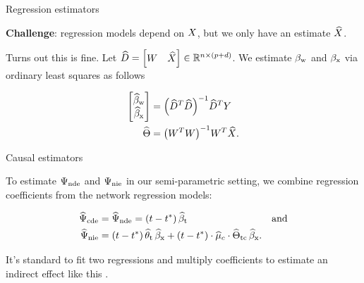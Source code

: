 \documentclass{beamer}
\theoremstyle{remark}
\begin{document}
\begin{frame}{Regression estimators}

    \textbf{Challenge}: regression models depend on $X$, but we only have an estimate $\widehat{X}$.

    \vspace{3mm}

    Turns out this is fine. Let $\widehat{D} = \begin{bmatrix} W & \widehat{X} \end{bmatrix} \in \mathbb{R}^{n \times (p + d)}$. We estimate $\beta_\text{w}$ and $\beta_\text{x}$ via ordinary least squares as follows

    \begin{align*}
        \begin{bmatrix}
            \betawhat \\
            \betaxhat
        \end{bmatrix}
         & = \paren*{\Dhat^T \Dhat}^{-1} \Dhat^T Y \\
        \Thetahat
         & = \paren*{\W^T \W}^{-1} \W^T \Xhat.
    \end{align*}
\end{frame}

\begin{frame}{Causal estimators}

    To estimate $\Psi_\text{nde}$ and $\Psi_\text{nie}$ in our semi-parametric setting, we combine regression coefficients from the network regression models:

    \begin{align*}
        \cdehat & = \ndehat = \paren*{t - t^*} \, \betathat                                                                              & \text{and} \\
        \niehat & = \paren*{t - t^*} \, \thetathat \, \betaxhat + \paren*{t - t^*} \cdot \widehat{\mu}_c \cdot \Thetatchat \, \betaxhat.
    \end{align*}

    It's standard to fit two regressions and multiply coefficients to estimate an indirect effect like this \citep{vanderweele_mediation_2014}.

\end{frame}
\end{document}
